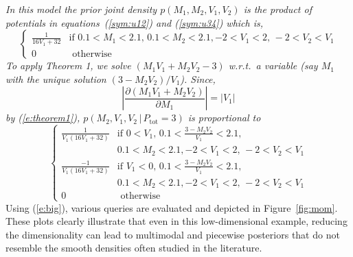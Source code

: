 \documentclass[letterpaper]{article}
\newcommand{\otherwise}[1]{#1 &\text{ otherwise}}
\newcommand{\pr}{p}
\begin{document}
\emph{
\noindent
In this model the prior joint density ${\pr(M_1, M_2, V_1, V_2)}$ is the product of potentials in equations~(\ref{sym:u12}) and (\ref{sym:u34}) which is,
$$
\begin{cases}
\frac{1}{16 V_1 + 32} &{\text{if }\scriptstyle 0.1<M_1<2.1, \, 0.1<M_2<2.1,}
							 {\scriptstyle -2<V_1<2, \, -2<V_2 < V_1}\\
 \otherwise{0}
 \end{cases}
$$  
To apply Theorem 1, we solve {\footnotesize$(M_1 V_1 + M_2 V_2 - 3)$}
w.r.t.\ a variable (say $M_1$ with the unique solution {\footnotesize$(3 - M_2 V_2)/V_1$}).
Since,  
{\footnotesize
$$\left| \frac{\partial (M_1 V_1 + M_2 V_2)}{\partial M_1} \right| = |V_1|
$$
}
by (\ref{e:theorem1}),
$\pr(M_2, V_1, V_2 \,|\, P_\text{tot} = 3)$ is proportional to
{\footnotesize
\begin{equation}\label{e:big}  
\begin{cases}
\frac{1}{V_1(16 V_1 + 32)} &{\text{if }\scriptstyle 0<V_1, \, 0.1<\frac{3-M_2 V_2}{V_1}<2.1,}\\
							 &{\scriptstyle 0.1<M_2<2.1, -2<V_1<2, \, -2<V_2 < V_1}\\
\frac{-1}{V_1(16 V_1 + 32)} &{\text{if }\scriptstyle V_1<0, \, 0.1<\frac{3-M_2 V_2}{V_1}<2.1,}\\
							 &{\scriptstyle 0.1<M_2<2.1, -2<V_1<2, \, -2<V_2 < V_1}\\
 \otherwise{0}
 \end{cases}
\end{equation}
}
}%
Using (\ref{e:big}), various queries are evaluated and depicted in Figure~\ref{fig:mom}.
These plots clearly illustrate that even in this 
low-dimensional example, reducing the dimensionality can lead
to multimodal and piecewise posteriors that do not resemble the
smooth densities often studied in the literature.  
\end{document}
